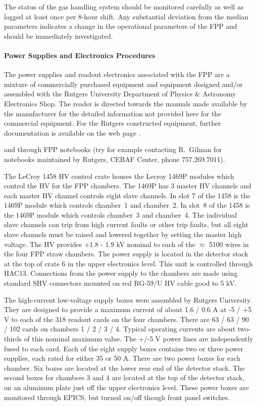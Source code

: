 {The status of the gas handling system should be monitored carefully
as well as logged at least once per 8-hour shift.  Any substantial
deviation from the median parameters indicates a change in the
operational parameters of the FPP and should be immediately
investigated.  

\paragraph{Power Supplies and Electronics Procedures}

The power supplies and readout electronics associated with the FPP
are a mixture of commercially purchased equipment
and equipment designed and/or assembled with the Rutgers
University Department of Physics \& Astronomy Electronics Shop.
The reader is directed towards the manuals made available by the
manufacturer for the detailed information not provided here
for the commercial equipment.
For the Rutgers constructed equipment,
further documentation is available on the web page%
.

\noindent
and through FPP notebooks (try for example contacting R.\ Gilman 
for notebooks maintained by Rutgers, CEBAF Center, phone 757.269.7011).

The LeCroy 1458 HV control crate houses the Lecroy  1469P modules
which control the HV for the FPP chambers. The 1469P has 3 master HV
channels and each master HV channel controls eight slave channels.
In slot 7 of the 1458 is the 1469P module 
which controls chamber~1 and chamber~2.
In slot~8 of the 1458 is the 1469P module 
which controls chamber~3 and chamber~4.
The individual slave channels can trip from high current faults
or other trip faults, but all eight slave channels must be raised and lowered
together by setting the master high voltage.
The HV provides +1.8 - 1.9 kV nominal to
each of the $\approx$ 5100 wires in the four FPP straw chambers.
The power supply is located in the detector stack at the top of
crate 6 in the upper electronics level.
This unit is controlled through HAC13.
Connections from the power supply to the chambers are made using
standard SHV connectors mounted on red RG-59/U HV cable good to 5 kV.

The high-current low-voltage supply boxes were assembled by Rutgers
University.
They are designed to provide a maximum current of about 1.6 / 0.6 A
at -5 / +5 V to each of the 318 readout cards on the four chambers.
There are 63 / 63 / 90 / 102 cards on chambers 1 / 2 / 3 / 4.
Typical operating currents are about two-thirds of this nominal
maximum value.
The +/-5 V power lines are independently fused to each card.
Each of the eight supply boxes contains two or three power supplies,
each rated for either 35 or 50 A.
There are two power boxes for each chamber.
Six boxes are located at the lower rear end of the detector stack.
The second boxes for chambers 3 and 4 are located at the top of the
detector stack, on an aluminum plate just off the upper electronics level.
These power boxes are monitored through EPICS, but turned on/off
though front panel switches.

}
